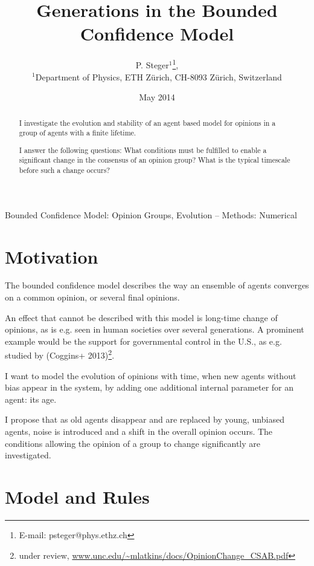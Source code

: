 \documentclass[useAMS,usenatbib]{mn2e}
\title[Generations in Bounded Confidence]{Generations in the Bounded Confidence Model}
\author[P. Steger]{P. Steger$^{1}$\thanks{E-mail: psteger@phys.ethz.ch},\\
 $^{1}$Department of Physics, ETH Z\"urich, CH-8093 Z\"urich,
 Switzerland
}
\begin{document}
\date{May 2014}
\label{firstpage}
\maketitle

\begin{abstract}
    I investigate the evolution and stability of an
    agent based model for opinions in a group of agents with a
    finite lifetime.

    I answer the following questions: What conditions must be fulfilled to
    enable a significant change in the consensus of an opinion group?
    What is the typical timescale before such a change occurs?
\end{abstract}

\begin{keywords}
 Bounded Confidence Model: Opinion Groups, Evolution --
 Methods: Numerical
\end{keywords}



\section{Motivation}
\label{sec:motivation}
The bounded confidence model describes the way an ensemble of agents
converges on a common opinion, or several final opinions.

An effect that cannot be described with this model is long-time change
of opinions, as is e.g. seen in human societies over several
generations. A prominent example would be the support for governmental control
in the U.S., as e.g. studied by (Coggins+ 2013)\footnote{under review,
\url{www.unc.edu/~mlatkins/docs/OpinionChange_CSAB.pdf}}.

I want to model the evolution of opinions with time, when new agents
without bias appear in the system, by adding one additional internal
parameter for an agent: its age.

I propose that as old agents disappear and are replaced by young,
unbiased agents, noise is introduced and a shift in the overall
opinion occurs. The conditions allowing the opinion of a group to
change significantly are investigated.


\section{Model and Rules}
\label{sec:model}
\end{document}
